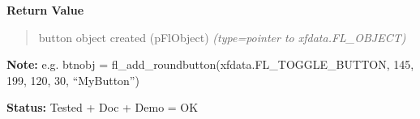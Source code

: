 \begin{boxedminipage}{\funcwidth}
      \textbf{Return Value}
    \vspace{-1ex}

      \begin{quote}

button object created (pFlObject)
      {\it (type=pointer to xfdata.FL\_OBJECT)}

      \end{quote}

\textbf{Note:} 
e.g. btnobj = fl\_add\_roundbutton(xfdata.FL\_TOGGLE\_BUTTON, 145,
199, 120, 30, ``MyButton'')


\textbf{Status:} 
Tested + Doc + Demo = OK


    \end{boxedminipage}

    \label{xformslib:flbutton:fl_add_round3dbutton}

    \vspace{0.5ex}

